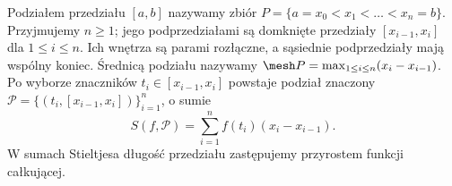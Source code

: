 Podziałem przedziału $[a,b]$ nazywamy zbiór $P=\{a=x_0<x_1<\dots<x_n=b\}$. Przyjmujemy $n\ge1$; jego podprzedziałami są domknięte przedziały $[x_{i-1},x_i]$ dla $1\le i\le n$. Ich wnętrza są parami rozłączne, a sąsiednie podprzedziały mają wspólny koniec. Średnicą podziału nazywamy $\mesh P=\max_{1\le i\le n}(x_i-x_{i-1})$. Po wyborze znaczników $t_i\in[x_{i-1},x_i]$ powstaje podział znaczony $\mathcal P=\{(t_i,[x_{i-1},x_i])\}_{i=1}^n$, o sumie
\[
S(f,\mathcal P)=\sum_{i=1}^n f(t_i)(x_i-x_{i-1}).
\]
W sumach Stieltjesa długość przedziału zastępujemy przyrostem funkcji całkującej.

